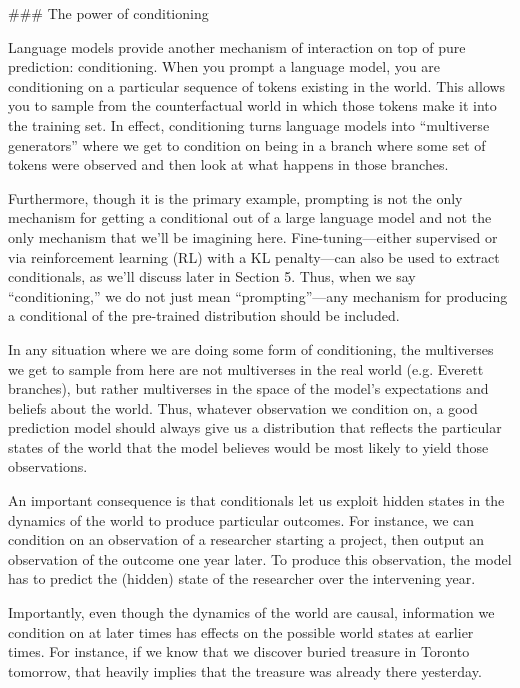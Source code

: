{### The power of conditioning

Language models provide another mechanism of interaction on top of pure prediction: conditioning. When you prompt a language model, you are conditioning on a particular sequence of tokens existing in the world. This allows you to sample from the counterfactual world in which those tokens make it into the training set. In effect, conditioning turns language models into ``multiverse generators\cite{TODO: cite https://generative.ink/posts/language-models-are-multiverse-generators/}'' where we get to condition on being in a branch where some set of tokens were observed and then look at what happens in those branches.

Furthermore, though it is the primary example, prompting is not the only mechanism for getting a conditional out of a large language model and not the only mechanism that we'll be imagining here. Fine-tuning---either supervised or via reinforcement learning (RL) with a KL penalty\cite{TODO: cite https://www.lesswrong.com/posts/eoHbneGvqDu25Hasc/rl-with-kl-penalties-is-better-seen-as-bayesian-inference}---can also be used to extract conditionals, as we'll discuss later in Section 5\cite{TODO: cite TODO}. Thus, when we say ``conditioning,'' we do not just mean ``prompting''---any mechanism for producing a conditional of the pre-trained distribution should be included.

In any situation where we are doing some form of conditioning, the multiverses we get to sample from here are not multiverses in the real world (e.g. Everett branches\cite{TODO: cite https://www.lesswrong.com/posts/2D9s6kpegDQtrueBE/multiple-worlds-one-universal-wave-function}), but rather multiverses in the space of the model's expectations and beliefs about the world. Thus, whatever observation we condition on, a good prediction model should always give us a distribution that reflects the particular states of the world that the model believes would be most likely to yield those observations.

An important consequence is that conditionals let us exploit hidden states in the dynamics of the world to produce particular outcomes. For instance, we can condition on an observation of a researcher starting a project, then output an observation of the outcome one year later. To produce this observation, the model has to predict the (hidden) state of the researcher over the intervening year.

Importantly, even though the dynamics of the world are causal, information we condition on at later times has effects on the possible world states at earlier times. For instance, if we know that we discover buried treasure in Toronto tomorrow, that heavily implies that the treasure was already there yesterday.

}
